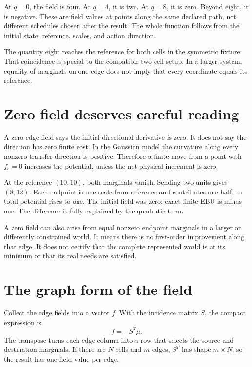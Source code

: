 At \(q=0\), the field is four. At \(q=4\), it is two. At \(q=8\), it is zero. Beyond eight, it is negative. These are field values at points along the same declared path, not different schedules chosen after the result. The whole function follows from the initial state, reference, scales, and action direction.

The quantity eight reaches the reference for both cells in the symmetric fixture. That coincidence is special to the compatible two-cell setup. In a larger system, equality of marginals on one edge does not imply that every coordinate equals its reference.


\section{Zero field deserves careful reading}
A zero edge field says the initial directional derivative is zero. It does not say the direction has zero finite cost. In the Gaussian model the curvature along every nonzero transfer direction is positive. Therefore a finite move from a point with \(f_e=0\) increases the potential, unless the net physical increment is zero.

At the reference \((10,10)\), both marginals vanish. Sending two units gives \((8,12)\). Each endpoint is one scale from reference and contributes one-half, so total potential rises to one. The initial field was zero; exact finite EBU is minus one. The difference is fully explained by the quadratic term.

A zero field can also arise from equal nonzero endpoint marginals in a larger or differently constrained world. It means there is no first-order improvement along that edge. It does not certify that the complete represented world is at its minimum or that its real needs are satisfied.

\section{The graph form of the field}
Collect the edge fields into a vector \(f\). With the incidence matrix \(S\), the compact expression is
\begin{equation}
 f=-S^T\mu.
\end{equation}
The transpose turns each edge column into a row that selects the source and destination marginals. If there are \(N\) cells and \(m\) edges, \(S^T\) has shape \(m\times N\), so the result has one field value per edge.


